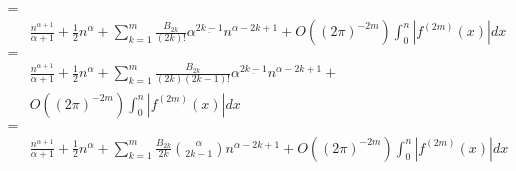 \documentclass{article}
\begin{document}
\begin{align*}
= & \\
& \frac{n^{\alpha+1}}{\alpha+1}
  + \frac{1}{2} n^\alpha + \sum_{k=1}^m \frac{B_{2k}}{(2k)!} \alpha^{\underline{2k-1}} n^{\alpha-2k+1} +
  O((2\pi)^{-2m}) \int_0^n | f^{(2m)}(x) | dx \\
= & \\
& \frac{n^{\alpha+1}}{\alpha+1}
  + \frac{1}{2} n^\alpha + \sum_{k=1}^m \frac{B_{2k}}{(2k)(2k-1)!} \alpha^{\underline{2k-1}} n^{\alpha-2k+1} + \\
& O((2\pi)^{-2m}) \int_0^n | f^{(2m)}(x) | dx \\
= & \\
& \frac{n^{\alpha+1}}{\alpha+1}
  + \frac{1}{2} n^\alpha + \sum_{k=1}^m \frac{B_{2k}}{2k} \binom{\alpha}{2k-1} n^{\alpha-2k+1} + 
  O((2\pi)^{-2m}) \int_0^n | f^{(2m)}(x) | dx \\
\end{align*}
\end{document}
